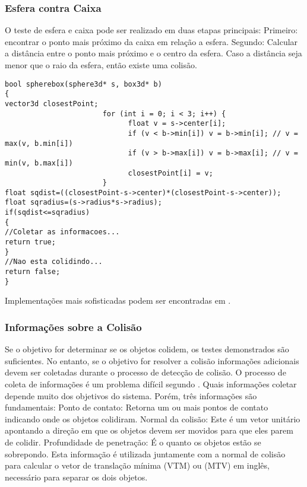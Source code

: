 \subsubsection{Esfera contra Caixa}

O teste de esfera e caixa pode ser realizado em duas etapas principais:
Primeiro: encontrar o ponto mais próximo da caixa em relação a esfera.
Segundo: Calcular a distância entre o ponto mais próximo e o centro da esfera.
Caso a distância seja menor que o raio da esfera, então existe uma colisão.

\begin{lstlisting}[frame=single,caption=Colisão entre esfera e caixa\label{code:collisionSphereBox}]
bool spherebox(sphere3d* s, box3d* b)
{
vector3d closestPoint;
                       for (int i = 0; i < 3; i++) {
                             float v = s->center[i];
                             if (v < b->min[i]) v = b->min[i]; // v = max(v, b.min[i])
                             if (v > b->max[i]) v = b->max[i]; // v = min(v, b.max[i])
                             closestPoint[i] = v;
                       }
float sqdist=((closestPoint-s->center)*(closestPoint-s->center));
float sqradius=(s->radius*s->radius);
if(sqdist<=sqradius)
{
//Coletar as informacoes...
return true;
}
//Nao esta colidindo...
return false;
}
\end{lstlisting}

Implementações mais sofisticadas podem ser encontradas em .

\subsubsection{Informações sobre a Colisão}

Se o objetivo for determinar  se os objetos colidem, os testes demonstrados são
suficientes. No entanto, se o objetivo for resolver a colisão informações adicionais devem
ser coletadas durante o processo de detecção de colisão. O processo de coleta
de informações é um problema difícil segundo .
Quais informações coletar depende muito dos objetivos do sistema. Porém, três
informações são fundamentais:
Ponto de contato: Retorna um ou mais pontos de contato indicando onde os objetos colidiram.
Normal da colisão: Este é um vetor unitário apontando a direção em que os objetos devem ser movidos para que eles parem de colidir.
Profundidade de penetração: É o quanto os objetos estão se sobrepondo. Esta
informação é utilizada juntamente com a normal de colisão para calcular o vetor
de translação mínima (VTM) ou (MTV) em inglês, necessário para separar os dois
objetos.

